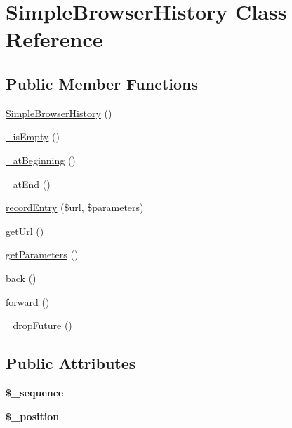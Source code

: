 \hypertarget{class_simple_browser_history}{
\section{SimpleBrowserHistory Class Reference}
\label{class_simple_browser_history}
}
\subsection*{Public Member Functions}
\begin{DoxyCompactItemize}
\item 
\hyperlink{class_simple_browser_history_a2127741caab69dd12cc32b322d5e11fa}{SimpleBrowserHistory} ()
\item 
\hyperlink{class_simple_browser_history_a563ca44364f4def86a41eb683ecd2cee}{\_\-isEmpty} ()
\item 
\hyperlink{class_simple_browser_history_a04977574d4720fc63770afefce6aed39}{\_\-atBeginning} ()
\item 
\hyperlink{class_simple_browser_history_a8165fbf967fc0cdf2b626c8eb026ab72}{\_\-atEnd} ()
\item 
\hyperlink{class_simple_browser_history_a788a233220aecc310b56f21562c06d43}{recordEntry} (\$url, \$parameters)
\item 
\hyperlink{class_simple_browser_history_aed47b8f24be922789e6046ae5403efbb}{getUrl} ()
\item 
\hyperlink{class_simple_browser_history_a2f597f5be027a5a2f1d389dfae75a202}{getParameters} ()
\item 
\hyperlink{class_simple_browser_history_a7117827a2f383f6ab09abe03514de49b}{back} ()
\item 
\hyperlink{class_simple_browser_history_ad6015f6f26f06f236c60299e5df9aec7}{forward} ()
\item 
\hyperlink{class_simple_browser_history_a5d40551c31b6a3a4f7d8db7bba45d18d}{\_\-dropFuture} ()
\end{DoxyCompactItemize}
\subsection*{Public Attributes}
\begin{DoxyCompactItemize}
\item 
\hypertarget{class_simple_browser_history_ae68cfc918370f057f59129f96796d134}{
{\bfseries \$\_\-sequence}}
\label{class_simple_browser_history_ae68cfc918370f057f59129f96796d134}

\item 
\hypertarget{class_simple_browser_history_ac97a4084fddc3822cb7f1802e74abbb3}{
{\bfseries \$\_\-position}}
\label{class_simple_browser_history_ac97a4084fddc3822cb7f1802e74abbb3}

\end{DoxyCompactItemize}


